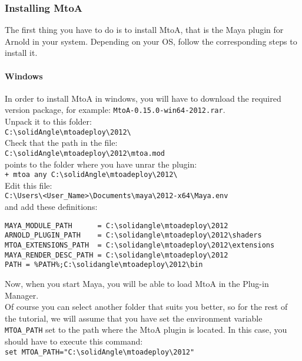 \subsubsection{Installing MtoA}
The first thing you have to do is to install MtoA, that is the Maya plugin for Arnold in your system. Depending on your OS, follow the corresponding steps to install it.
\paragraph{Windows}

In order to install MtoA in windows, you will have to download the required version package, for example: \texttt{MtoA-0.15.0-win64-2012.rar}.\\

Unpack it to this folder:\\
\verb|C:\solidAngle\mtoadeploy\2012\|\\

Check that the path in the file:\\
\verb|C:\solidAngle\mtoadeploy\2012\mtoa.mod|\\
points to the folder where you have unrar the plugin:\\
\verb|+ mtoa any C:\solidAngle\mtoadeploy\2012\|\\


Edit this file:\\
\verb|C:\Users\<User_Name>\Documents\maya\2012-x64\Maya.env|\\
and add these definitions:
{\footnotesize \begin{verbatim}
MAYA_MODULE_PATH      = C:\solidangle\mtoadeploy\2012
ARNOLD_PLUGIN_PATH    = C:\solidangle\mtoadeploy\2012\shaders
MTOA_EXTENSIONS_PATH  = C:\solidangle\mtoadeploy\2012\extensions
MAYA_RENDER_DESC_PATH = C:\solidangle\mtoadeploy\2012
PATH = %PATH%;C:\solidangle\mtoadeploy\2012\bin
\end{verbatim}}

Now, when you start Maya, you will be able to load MtoA in the Plug-in Manager.\\

Of course you can select another folder that suits you better, so for the rest of the tutorial, we will assume that you have set the environment variable \texttt{MTOA\_PATH} set to the path where the MtoA plugin is located. In this case, you should have to execute this command:\\
\verb|set MTOA_PATH="C:\solidAngle\mtoadeploy\2012"|

